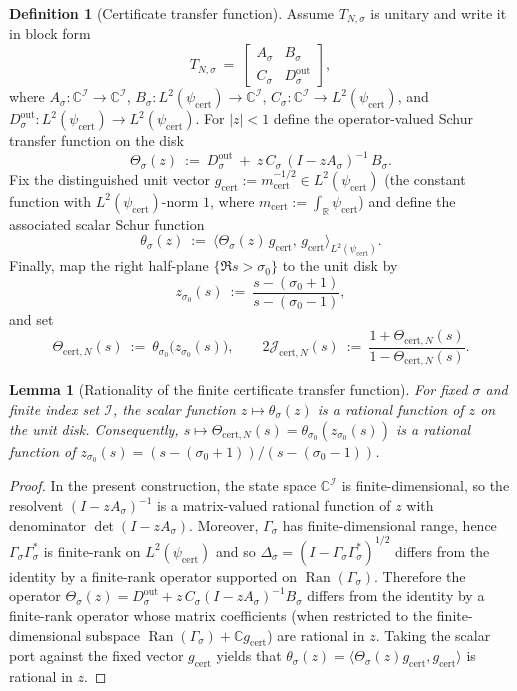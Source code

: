 \documentclass[11pt]{article}
\newtheorem{lemma}[theorem]{Lemma}
\theoremstyle{definition}
\newtheorem{definition}[theorem]{Definition}
\theoremstyle{remark}
\theoremstyle{definition}
\newcommand{\C}{\mathbb{C}}
\newcommand{\R}{\mathbb{R}}
\begin{document}
\begin{definition}[Certificate transfer function]\label{def:certificate-transfer}
Assume $T_{N,\sigma}$ is unitary and write it in block form
\[
  T_{N,\sigma}\ =\ \begin{bmatrix} A_\sigma & B_\sigma\\ C_\sigma & D_\sigma^{\mathrm{out}}\end{bmatrix},
\]
where $A_\sigma:\C^{\mathcal I}\to\C^{\mathcal I}$, $B_\sigma:L^2(\psi_{\mathrm{cert}})\to\C^{\mathcal I}$, $C_\sigma:\C^{\mathcal I}\to L^2(\psi_{\mathrm{cert}})$, and $D_\sigma^{\mathrm{out}}:L^2(\psi_{\mathrm{cert}})\to L^2(\psi_{\mathrm{cert}})$.
For $|z|<1$ define the operator-valued Schur transfer function on the disk
\[
  \Theta_{\sigma}(z)\ :=\ D_\sigma^{\mathrm{out}}\ +\ z\,C_\sigma\,(I-zA_\sigma)^{-1}\,B_\sigma.
\]
Fix the distinguished unit vector $g_{\mathrm{cert}}:=m_{\mathrm{cert}}^{-1/2}\in L^2(\psi_{\mathrm{cert}})$ (the constant function with $L^2(\psi_{\mathrm{cert}})$-norm $1$, where $m_{\mathrm{cert}}:=\int_\R \psi_{\mathrm{cert}}$) and define the associated scalar Schur function
\[
  \theta_{\sigma}(z)\ :=\ \langle \Theta_{\sigma}(z)\,g_{\mathrm{cert}},\,g_{\mathrm{cert}}\rangle_{L^2(\psi_{\mathrm{cert}})}.
\]
Finally, map the right half-plane $\{\Re s>\sigma_0\}$ to the unit disk by
\[
  z_{\sigma_0}(s)\ :=\ \frac{s-(\sigma_0+1)}{s-(\sigma_0-1)},
\]
and set
\[
  \Theta_{\mathrm{cert},N}(s)\ :=\ \theta_{\sigma_0}\big(z_{\sigma_0}(s)\big),\qquad
  2\mathcal J_{\mathrm{cert},N}(s)\ :=\ \frac{1+\Theta_{\mathrm{cert},N}(s)}{1-\Theta_{\mathrm{cert},N}(s)}.
\]
\end{definition}

\begin{lemma}[Rationality of the finite certificate transfer function]\label{lem:cert-rational}
For fixed $\sigma$ and finite index set $\mathcal I$, the scalar function $z\mapsto \theta_\sigma(z)$ is a rational function of $z$ on the unit disk. Consequently, $s\mapsto \Theta_{\mathrm{cert},N}(s)=\theta_{\sigma_0}(z_{\sigma_0}(s))$ is a rational function of $z_{\sigma_0}(s)=(s-(\sigma_0+1))/(s-(\sigma_0-1))$.
\end{lemma}
\begin{proof}
In the present construction, the state space $\C^{\mathcal I}$ is finite-dimensional, so the resolvent $(I-zA_\sigma)^{-1}$ is a matrix-valued rational function of $z$ with denominator $\det(I-zA_\sigma)$.
Moreover, $\Gamma_\sigma$ has finite-dimensional range, hence $\Gamma_\sigma\Gamma_\sigma^*$ is finite-rank on $L^2(\psi_{\mathrm{cert}})$ and so $\Delta_\sigma=(I-\Gamma_\sigma\Gamma_\sigma^*)^{1/2}$ differs from the identity by a finite-rank operator supported on $\operatorname{Ran}(\Gamma_\sigma)$.
Therefore the operator $\Theta_\sigma(z)=D_\sigma^{\mathrm{out}}+z\,C_\sigma(I-zA_\sigma)^{-1}B_\sigma$ differs from the identity by a finite-rank operator whose matrix coefficients (when restricted to the finite-dimensional subspace $\operatorname{Ran}(\Gamma_\sigma)+\C g_{\mathrm{cert}}$) are rational in $z$.
Taking the scalar port against the fixed vector $g_{\mathrm{cert}}$ yields that $\theta_\sigma(z)=\langle \Theta_\sigma(z)g_{\mathrm{cert}},g_{\mathrm{cert}}\rangle$ is rational in $z$.
\end{proof}
\end{document}
